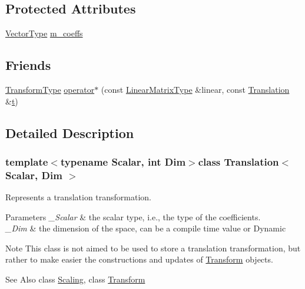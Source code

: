 \subsection*{Protected Attributes}
\begin{DoxyCompactItemize}
\item 
\hyperlink{class_translation_a1b1ee9d6d92ffebecdb94e4827653ef2}{Vector\-Type} \hyperlink{class_translation_ad8d42112aef505dd1db6a56dc797ee8a}{m\-\_\-coeffs}
\end{DoxyCompactItemize}
\subsection*{Friends}
\begin{DoxyCompactItemize}
\item 
\hyperlink{class_translation_a17aa136dd5b74ba443a87887a77e6e3b}{Transform\-Type} \hyperlink{class_translation_ab987107af677d025f45c39646706d701}{operator$\ast$} (const \hyperlink{class_translation_a4e4dc4e17b8a4d243682fa2d9bbeaa38}{Linear\-Matrix\-Type} \&linear, const \hyperlink{class_translation}{Translation} \&\hyperlink{glext_8h_a00140d6f5c548b26daf170bf16e86a6d}{t})
\end{DoxyCompactItemize}


\subsection{Detailed Description}
\subsubsection*{template$<$typename Scalar, int Dim$>$class Translation$<$ Scalar, Dim $>$}

Represents a translation transformation. 


\begin{DoxyParams}{Parameters}
{\em \-\_\-\-Scalar} & the scalar type, i.\-e., the type of the coefficients. \\
\hline
{\em \-\_\-\-Dim} & the dimension of the space, can be a compile time value or Dynamic\\
\hline
\end{DoxyParams}
\begin{DoxyNote}{Note}
This class is not aimed to be used to store a translation transformation, but rather to make easier the constructions and updates of \hyperlink{class_transform}{Transform} objects.
\end{DoxyNote}
\begin{DoxySeeAlso}{See Also}
class \hyperlink{class_scaling}{Scaling}, class \hyperlink{class_transform}{Transform} 
\end{DoxySeeAlso}



